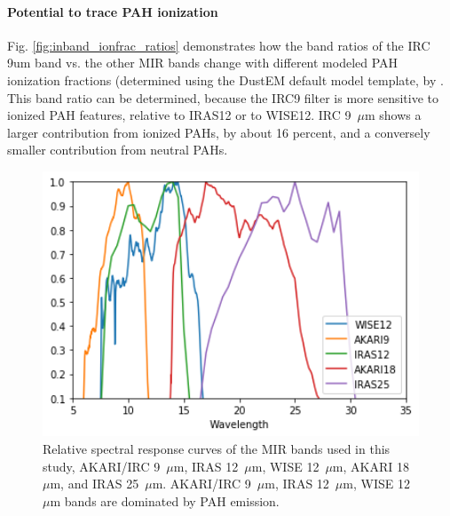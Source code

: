           \paragraph{Potential to trace PAH ionization}
            Fig. \ref{fig:inband_ionfrac_ratios} demonstrates how the band ratios of the IRC 9um band vs. the other MIR bands change with different modeled PAH ionization fractions (determined using the DustEM default model template, by \cite{dustem11}. This band ratio can be determined, because the IRC9 filter is more sensitive to ionized PAH features, relative to IRAS12 or to WISE12.
           IRC 9~$\mu$m shows a larger contribution from ionized PAHs, by about 16 percent, and a conversely smaller contribution from neutral PAHs.

       \begin{figure}
       \label{fig:relSpectralResponse_MIR}
       \centering
       \includegraphics[width=150mm]{../Plots/RelSpectralResponse_MIR.png}
       \caption{Relative spectral response curves of the MIR bands used in this study, AKARI/IRC 9~$\mu$m, IRAS 12~$\mu$m, WISE 12~$\mu$m, AKARI 18~$\mu$m, and  IRAS 25~$\mu$m. AKARI/IRC 9~$\mu$m, IRAS 12~$\mu$m, WISE 12~$\mu$m bands are dominated by PAH emission.}
       \end{figure}


